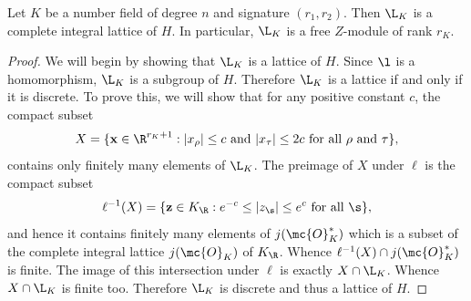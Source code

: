 \documentclass[12pt]{article}
\begin{document}
      \begin{theorem}\label{thm:unit_group_complete_lattice}
        Let \(K\) be a number field of degree \(n\) and signature \((r_{1},r_{2})\). Then \(\L_{K}\) is a complete integral lattice of \(H\). In particular, \(\L_{K}\) is a free \(Z\)-module of rank \(r_{K}\).
      \end{theorem}
      \begin{proof}
        We will begin by showing that \(\L_{K}\) is a lattice of \(H\). Since \(\l\) is a homomorphism, \(\L_{K}\) is a subgroup of \(H\). Therefore \(\L_{K}\) is a lattice if and only if it is discrete. To prove this, we will show that for any positive constant \(c\), the compact subset 
        \[
          X = \{\mathbf{x} \in \R^{r_{K}+1}:|x_{\rho}| \le c \text{ and } |x_{\tau}| \le 2c \text{ for all } \rho \text{ and } \tau\},
        \]
        contains only finitely many elements of \(\L_{K}\). The preimage of \(X\) under \(\ell\) is the compact subset
        \[
          \ell^{-1}(X) = \{\mathbf{z} \in K_{\R}:e^{-c} \le |z_{\s}| \le e^{c} \text{ for all } \s\},
        \]
        and hence it contains finitely many elements of \(j(\mc{O}_{K}^{\ast})\) which is a subset of the complete integral lattice \(j(\mc{O}_{K})\) of \(K_{\R}\). Whence \(\ell^{-1}(X) \cap j(\mc{O}_{K}^{\ast})\) is finite. The image of this intersection under \(\ell\) is exactly \(X \cap \L_{K}\). Whence \(X \cap \L_{K}\) is finite too. Therefore \(\L_{K}\) is discrete and thus a lattice of \(H\).
        

\end{proof}
\end{document}
